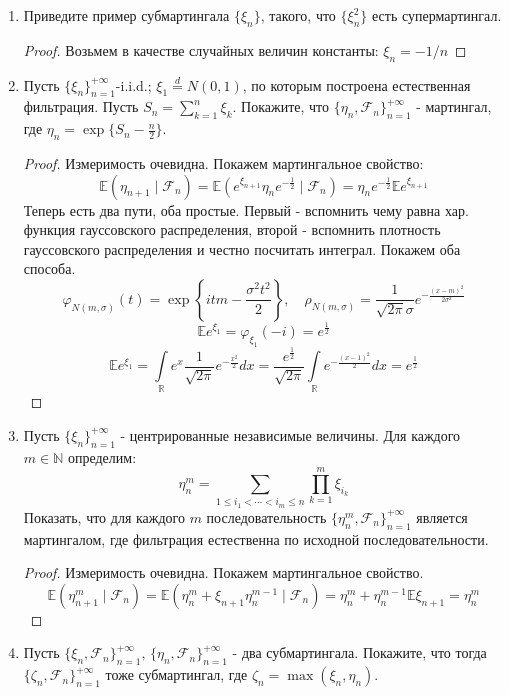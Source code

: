\documentclass[12pt,a4paper]{article} %
\newcommand{\R}{\mathbb{R}}
\newcommand{\E}{\mathbb{E}}
\newcommand{\PR}{\mathbb{P}}
\newcommand{\charf}[2][t]{\varphi_{#2}(#1)}
\newcommand{\F}{\mathcal{F}}
\begin{document}
\begin{enumerate}
\begin{proof}
			В качестве мартингала на естественной фильтрации возьмем префиксные суммы. Тогда из
			$$\sum_{k=1}^{+\infty}\PR(\xi_k=k^3-k)=\frac{\pi^2}{6}$$
			получаем требуемый предел.
		\end{proof}
		\item Приведите пример субмартингала $\{\xi_n\}$, такого, что $\{\xi_n^2\}$ есть супермартингал.
		\begin{proof}
			Возьмем в качестве случайных величин константы: $\xi_n=-1/n$
		\end{proof}
		\item Пусть $\{\xi_n\}_{n=1}^{+\infty}$-i.i.d.; $\xi_1\overset{d}{=}N(0,1)$, по которым построена естественная фильтрация. Пусть $S_n=\displaystyle\sum_{k=1}^n\xi_k$. Покажите, что $\{\eta_n,\F_n\}_{n=1}^{+\infty}$ - мартингал, где $\eta_n=\exp\{S_n-\frac{n}{2}\}$.
		\begin{proof}
			Измеримость очевидна. Покажем мартингальное свойство:
			$$\E(\eta_{n+1}\mid\F_n)=\E(e^{\xi_{n+1}}\eta_n e^{-\frac{1}{2}}\mid\F_n)=\eta_n e^{-\frac{1}{2}}\E e^{\xi_{n+1}}$$
			Теперь есть два пути, оба простые. Первый - вспомнить чему равна хар. функция гауссовского распределения, второй - вспомнить плотность гауссовского распределения и честно посчитать интеграл. Покажем оба способа.
			$$\charf{N(m,\sigma)}=\exp\left\{itm-\frac{\sigma^2t^2}{2}\right\},\quad\rho_{N(m,\sigma)}=\frac{1}{\sqrt{2\pi}\sigma}e^{-\frac{(x-m)^2}{2\sigma^2}}$$
			$$\E e^{\xi_1}=\charf[-i]{\xi_1}=e^{\frac{1}{2}}$$
			$$\E e^{\xi_1}=\int\limits_{\R}e^x\frac{1}{\sqrt{2\pi}}e^{-\frac{x^2}{2}}dx=\frac{e^{\frac{1}{2}}}{\sqrt{2\pi}}\int\limits_{\R}e^{-\frac{(x-1)^2}{2}}dx=e^{\frac{1}{2}}$$
		\end{proof}
		\item Пусть $\{\xi_n\}_{n=1}^{+\infty}$ - центрированные независимые величины. Для каждого $m\in\mathbb{N}$ определим:
		$$\eta_n^m=\sum_{1\leq i_1<\cdots<i_m\leq n}\prod_{k=1}^m\xi_{i_k}$$
		Показать, что для каждого $m$ последовательность $\{\eta_n^m,\F_n\}_{n=1}^{+\infty}$ является мартингалом, где фильтрация естественна по исходной последовательности.
		\begin{proof}
			Измеримость очевидна. Покажем мартингальное свойство.
			$$\E(\eta_{n+1}^m\mid\F_n)=\E(\eta_n^m+\xi_{n+1}\eta_n^{m-1}\mid\F_n)=\eta_n^m+\eta_n^{m-1}\E\xi_{n+1}=\eta_n^m$$
		\end{proof}
		\item Пусть $\{\xi_n,\F_n\}_{n=1}^{+\infty},\,\{\eta_n,\F_n\}_{n=1}^{+\infty}$ - два субмартингала. Покажите, что тогда $\{\zeta_n,\F_n\}_{n=1}^{+\infty}$ тоже субмартингал, где $\zeta_n=\max(\xi_n,\eta_n)$.

\end{enumerate}
\end{document}
